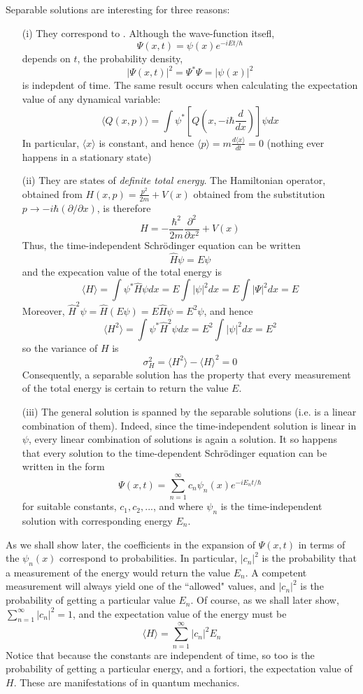 \documentclass[12pt, a4paper, oneside, openright, titlepage]{book}
\begin{document}
\begin{rmk}
    Separable solutions are interesting for three reasons:\begin{itemize}
        \item[(i)] They correspond to . Although the wave-function itsefl, $$\Psi(x,t) = \psi(x)e^{-iEt/\hbar}$$ depends on $t$, the probability density, $$|\Psi(x,t)|^2 = \Psi^*\Psi = |\psi(x)|^2$$ is indepdent of time. The same result occurs when calculating the expectation value of any dynamical variable: $$\langle Q(x,p)\rangle = \int\psi^*\left[Q\left(x,-i\hbar\frac{d}{dx}\right)\right]\psi dx$$
            In particular, $\langle x\rangle$ is constant, and hence $\langle p \rangle = m\frac{d\langle x\rangle}{dt} = 0$ (nothing ever happens in a stationary state)
        \item[(ii)] They are states of \emph{definite total energy}. The Hamiltonian operator, obtained from $H(x,p) = \frac{p^2}{2m}+V(x)$ obtained from the substitution $p\rightarrow -i\hbar(\partial/\partial x)$, is therefore $$\hat{H} = -\frac{\hbar^2}{2m}\frac{\partial^2}{\partial x^2} + V(x)$$
            Thus, the time-independent Schr\"{o}dinger equation can be written $$\hat{H}\psi = E\psi$$
            and the expecation value of the total energy is $$\langle H\rangle = \int \psi^*\hat{H}\psi dx = E\int|\psi|^2dx = E\int|\Psi|^2dx = E$$
            Moreover, $\hat{H}^2\psi = \hat{H}(E\psi) = E\hat{H}\psi = E^2\psi$, and hence $$\langle H^2\rangle = \int\psi^*\hat{H}^2\psi dx = E^2\int|\psi|^2dx = E^2$$ so the variance of $H$ is $$\sigma_H^2 = \langle H^2\rangle - \langle H\rangle^2 = 0$$
            Consequently, a separable solution has the property that every measurement of the total energy is certain to return the value $E$.
        \item[(iii)] The general solution is spanned by the separable solutions (i.e. is a linear combination of them). Indeed, since the time-independent solution is linear in $\psi$, every linear combination of solutions is again a solution. It so happens that every solution to the time-dependent Schr\"{o}dinger equation can be written in the form $$\Psi(x,t) = \sum_{n=1}^{\infty}c_n\psi_n(x)e^{-iE_nt/\hbar}$$ for suitable constants, $c_1,c_2,...$, and where $\psi_n$ is the time-independent solution with corresponding energy $E_n$.
    \end{itemize}
\end{rmk}

As we shall show later, the coefficients in the expansion of $\Psi(x,t)$ in terms of the $\psi_n(x)$ correspond to probabilities. In particular, $|c_n|^2$ is the probability that a measurement of the energy would return the value $E_n$. A competent measurement will always yield one of the ``allowed" values, and $|c_n|^2$ is the probability of getting a particular value $E_n$. Of course, as we shall later show, $\sum_{n=1}^{\infty}|c_n|^2 = 1$, and the expectation value of the energy must be $$\langle H\rangle =\sum_{n=1}^{\infty}|c_n|^2E_n$$
Notice that because the constants are independent of time, so too is the probability of getting a particular energy, and a fortiori, the expectation value of $H$. These are manifestations of  in quantum mechanics.
\end{document}
